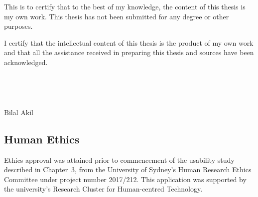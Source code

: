 \documentclass[11pt,a4paper,british]{report}
\begin{document}
{  This is to certify that to the best of my knowledge, the content of this thesis is my own work. This thesis has not been submitted for any degree or other purposes.

  I certify that the intellectual content of this thesis is the product of my own work and that all the assistance received in preparing this thesis and sources have been acknowledged.

  ~
  
  ~

  Bilal Akil
  

  \subsection*{Human Ethics}

  Ethics approval was attained prior to commencement of the usability study described in Chapter~3, from the University of Sydney's Human Research Ethics Committee under project number 2017/212. This application was supported by the university's Research Cluster for Human-centred Technology.

}

\newpage





\setcounter{page}{4}
\tableofcontents







\printbibliography[heading=bibintoc]
\end{document}
